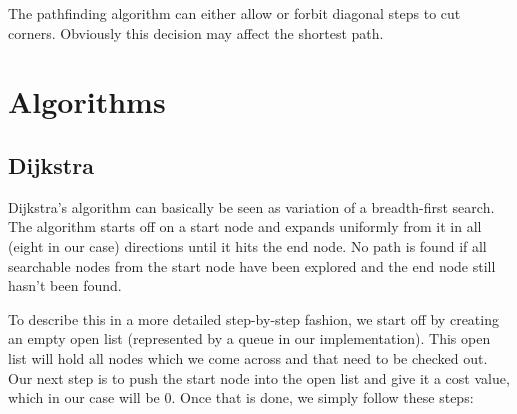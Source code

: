\documentclass[12pt, a4paper]{article}
\begin{document}






The pathfinding algorithm can either allow or forbit diagonal steps to cut
corners. Obviously this decision may affect the shortest path. \cite{astar2}



\section{Algorithms}
\label{Algorithms}


\subsection{Dijkstra}


Dijkstra's algorithm can basically be seen as variation of a breadth-first search. The algorithm starts off
on a start node and expands uniformly from it in all (eight in our case) directions until it hits
the end node. No path is found if all searchable nodes from the start node have been explored and
the end node still hasn't been found.

To describe this in a more detailed step-by-step fashion, we start off by creating an empty
open list (represented by a queue \cite{lecture28} in our implementation).
This open list will hold all nodes which we come across and that need to be checked out.
Our next step is to push the start node into the open list and give it a cost value, which
in our case will be 0. Once that is done, we simply follow these steps:
\end{document}
